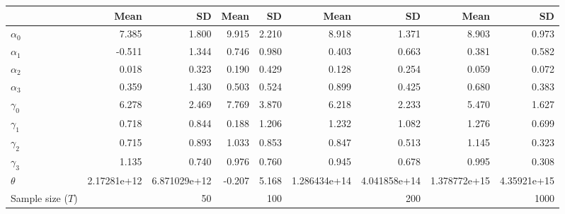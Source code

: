 
\begin{tabular}[t]{lrrrrrrrr}
\toprule
  & Mean & SD & Mean  & SD  & Mean   & SD   & Mean    & SD   \\
\midrule
$\alpha_{0}$ & 7.385 & 1.800 & 9.915 & 2.210 & 8.918 & 1.371 & 8.903 & 0.973\\
$\alpha_{1}$ & -0.511 & 1.344 & 0.746 & 0.980 & 0.403 & 0.663 & 0.381 & 0.582\\
$\alpha_{2}$ & 0.018 & 0.323 & 0.190 & 0.429 & 0.128 & 0.254 & 0.059 & 0.072\\
$\alpha_{3}$ & 0.359 & 1.430 & 0.503 & 0.524 & 0.899 & 0.425 & 0.680 & 0.383\\
$\gamma_{0}$ & 6.278 & 2.469 & 7.769 & 3.870 & 6.218 & 2.233 & 5.470 & 1.627\\
$\gamma_{1}$ & 0.718 & 0.844 & 0.188 & 1.206 & 1.232 & 1.082 & 1.276 & 0.699\\
$\gamma_{2}$ & 0.715 & 0.893 & 1.033 & 0.853 & 0.847 & 0.513 & 1.145 & 0.323\\
$\gamma_{3}$ & 1.135 & 0.740 & 0.976 & 0.760 & 0.945 & 0.678 & 0.995 & 0.308\\
$\theta$ & 2.17281e+12 & 6.871029e+12 & -0.207 & 5.168 & 1.286434e+14 & 4.041858e+14 & 1.378772e+15 & 4.35921e+15\\
Sample size ($T$) &  & 50 &  & 100 &  & 200 &  & 1000\\
\bottomrule
\end{tabular}

